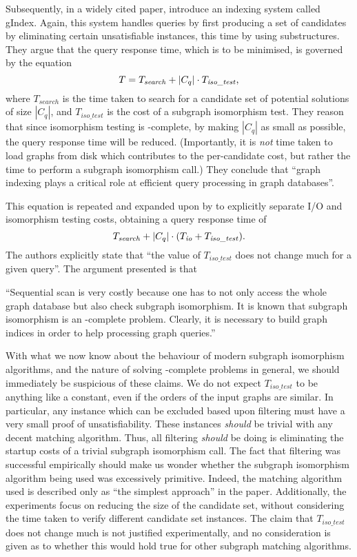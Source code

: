 \documentclass[twoside,11pt]{article}
\newcommand{\citet}[1]{\citeA{#1}}
\begin{document}
Subsequently, in a widely cited paper, \citet{DBLP:conf/sigmod/YanYH04} introduce an indexing system
called gIndex. Again, this system handles queries by first producing a set of candidates by
eliminating certain unsatisfiable instances, this time by using substructures. They argue that the
query response time, which is to be minimised, is governed by the equation \[ T =
T_{\mathit{search}} + \left|C_q\right| \cdot T_{\mathit{iso\_test}} \textnormal{,}\] where
$T_{\mathit{search}}$ is the time taken to search for a candidate set of potential solutions of size
$\left|C_q\right|$, and $T_{\mathit{iso\_test}}$ is the cost of a subgraph isomorphism test. They
reason that since isomorphism testing is \NP-complete, by making $\left|C_q\right|$ as small as
possible, the query response time will be reduced.  (Importantly, it is \emph{not} time taken to
load graphs from disk which contributes to the per-candidate cost, but rather the time to perform a
subgraph isomorphism call.) They conclude that ``graph indexing plays a critical role at efficient
query processing in graph databases''.

This equation is repeated and expanded upon by \citet{DBLP:journals/tods/YanYH05} to explicitly
separate I/O and isomorphism testing costs, obtaining a query response time of \[
    T_{\mathit{search}} + \left|C_q\right| \cdot (T_{\mathit{io}} + T_{\mathit{iso\_test}})
    \textnormal{.} \] The authors explicitly state that ``the value of $T_{\mathit{iso\_test}}$ does
not change much for a given query''. The argument presented is that
\begin{displayquote}``Sequential scan is very costly
because one has to not only access the whole graph database but also check subgraph isomorphism. It
is known that subgraph isomorphism is an \NP-complete problem. Clearly, it is necessary to build
graph indices in order to help processing graph queries.''\end{displayquote}

With what we now know about the behaviour of modern subgraph isomorphism algorithms, and the nature
of solving \NP-complete problems in general, we should immediately be suspicious of these claims. We
do not expect $T_{\mathit{iso\_test}}$ to be anything like a constant, even if the orders of the
input graphs are similar. In particular, any instance which can be excluded based upon filtering
must have a very small proof of unsatisfiability. These instances \emph{should} be trivial with any
decent matching algorithm. Thus, all filtering \emph{should} be doing is eliminating the startup
costs of a trivial subgraph isomorphism call. The fact that filtering was successful empirically
should make us wonder whether the subgraph isomorphism algorithm being used was excessively
primitive. Indeed, the matching algorithm used is described only as ``the simplest approach'' in the
paper.  Additionally, the experiments focus on reducing the size of the candidate set, without
considering the time taken to verify different candidate set instances.  The claim that
$T_{\mathit{iso\_test}}$ does not change much is not justified experimentally, and no consideration
is given as to whether this would hold true for other subgraph matching algorithms.
\end{document}
